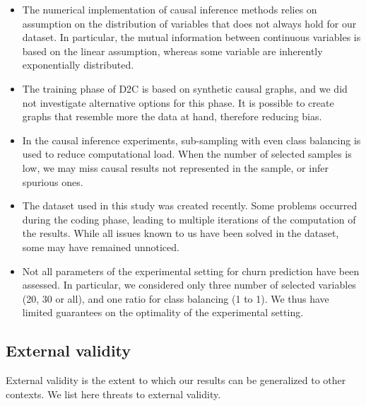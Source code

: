 \begin{itemize}
	\item The numerical implementation of causal inference methods relies on
	assumption on the distribution of variables that does not always hold for
	our dataset. In particular, the mutual information between continuous
	variables is based on the linear assumption, whereas some variable are
	inherently exponentially distributed.

	\item The training phase of D2C is based on synthetic causal graphs, and we
	did not investigate alternative options for this phase. It is possible to
	create graphs that resemble more the data at hand, therefore reducing bias.

	\item In the causal inference experiments, sub-sampling with even class
	balancing is used to reduce computational load. When the number of selected
	samples is low, we may miss causal results not represented in the sample, or
	infer spurious ones.

	\item The dataset used in this study was created recently. Some problems
	occurred during the coding phase, leading to multiple iterations of the
	computation of the results. While all issues known to us have been solved
	in the dataset, some may have remained unnoticed.

	\item Not all parameters of the experimental setting for churn prediction
	have been assessed. In particular, we considered only three number of
	selected variables (20, 30 or all), and one ratio for class balancing (1 to
	1). We thus have limited guarantees on the optimality of the experimental
	setting.

\end{itemize}

\subsection{External validity}

External validity is the extent to which our results can be generalized to other
contexts. We list here threats to external validity.

